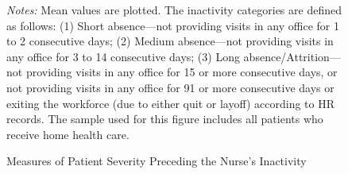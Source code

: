 \documentclass[final,12pt, notitlepage]{article}
\begin{document}
\begin{singlespace}
\graphicspath{ {/Users/kunheekim/Dropbox/Wharton/Research/Labor/gph/anhandoff/} }
\begin{figure}[H]
\begin{minipage}{\linewidth}
\centering
{}
{}
{}
\footnotesize
\justify
\emph{Notes:} Mean values are plotted.
The inactivity categories are defined as follows:
(1) Short absence---not providing visits in any office for 1 to 2 consecutive days;
(2) Medium absence---not providing visits in any office for 3 to 14 consecutive days;
(3) Long absence/Attrition---not providing visits in any office for 15 or more consecutive days, or not providing visits in any office for 91 or more consecutive days or exiting the workforce (due to either quit or layoff) according to HR records.
The sample used for this figure includes all patients who receive home health care.
\end{minipage}
\caption[Measures of Patient Severity Preceding the Nurse's Inactivity]%
{Measures of Patient Severity Preceding the Nurse's Inactivity}
\label{fig:severity_byday}
\end{figure}


\end{singlespace}
\end{document}
